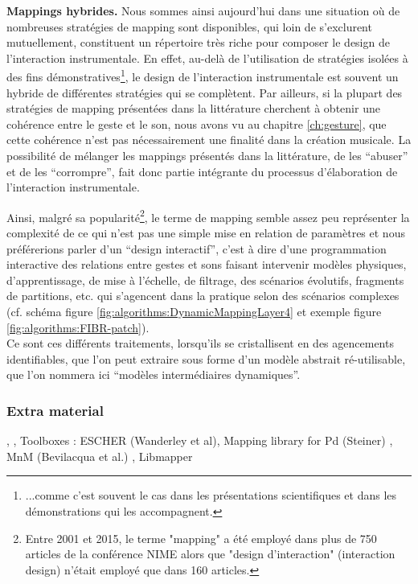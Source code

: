 \par{\textbf{Mappings hybrides.}} Nous sommes ainsi aujourd'hui dans une situation où de nombreuses stratégies de mapping sont disponibles, qui loin de s'exclurent mutuellement, constituent un répertoire très riche pour composer le design de l'interaction instrumentale. En effet, au-delà de l'utilisation de stratégies isolées à des fins démonstratives\footnote{...comme c'est souvent le cas dans les présentations scientifiques et dans les démonstrations qui les accompagnent.}, le design de l'interaction instrumentale est souvent un hybride de différentes stratégies qui se complètent. Par ailleurs, si la plupart des stratégies de mapping présentées dans la littérature cherchent à obtenir une cohérence entre le geste et le son, nous avons vu au chapitre \ref{ch:gesture}, que cette cohérence n'est pas nécessairement une finalité dans la création musicale. La possibilité de mélanger les mappings présentés dans la littérature, de les ``abuser'' et de les ``corrompre'', fait donc partie intégrante du processus d'élaboration de l'interaction instrumentale.

\indent Ainsi, malgré sa popularité\footnote{Entre 2001 et 2015, le terme "mapping" a été employé dans plus de 750 articles de la conférence \gls{NIME} alors que "design d'interaction" (interaction design) n'était employé que dans 160 articles.}, le terme de mapping semble assez peu représenter la complexité de ce qui n'est pas une simple mise en relation de paramètres et nous préférerions parler d'un ``design interactif'', c'est à dire d'une programmation interactive des relations entre gestes et sons faisant intervenir modèles physiques, d'apprentissage, de mise à l'échelle, de filtrage, des scénarios évolutifs, fragments de partitions, etc. qui s'agencent dans la pratique selon des scénarios complexes (cf. schéma figure \ref{fig:algorithms:DynamicMappingLayer4} et exemple figure \ref{fig:algorithms:FIBR-patch}).\\
\noindent Ce sont ces différents traitements, lorsqu'ils se cristallisent en des agencements identifiables, que l'on peut extraire sous forme d'un modèle abstrait ré-utilisable, que l'on nommera ici ``modèles intermédiaires dynamiques''.

\subsubsection{Extra material}

\cite{momeni_dynamic_2006}, \cite{winkler_making_1995}, 
Toolboxes : ESCHER (Wanderley et al)\cite{wanderley_escher-modeling_1998}, Mapping library for Pd (Steiner) \cite{steiner_towards_2006}, MnM (Bevilacqua et al.) \cite{bevilacqua_mnm_2005}, Libmapper

